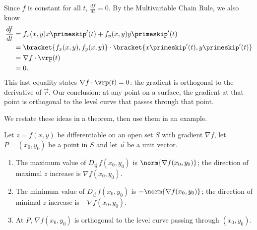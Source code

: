 Since $f$ is constant for all $t$, $\frac{df}{dt} = 0$. By the Multivariable Chain Rule, we also know
\begin{align*}
\frac{df}{dt} &= f_x(x,y)x\primeskip'(t) + f_y(x,y)y\primeskip'(t)\\
	&=\bracket{f_x(x,y),f_y(x,y)}\cdot\bracket{x\primeskip'(t),y\primeskip'(t)}\\
						&= \nabla f \cdot \vrp(t)\\
						&=0.
\end{align*}
This last equality states $\nabla f \cdot \vrp(t) = 0$: the gradient is orthogonal to the derivative of $\vec r$. Our conclusion: at any point on a surface, the gradient at that point is orthogonal to the level curve that passes through that point.

We restate these ideas in a theorem, then use them in an example.

{Let $z=f(x,y)$ be differentiable on an open set $S$ with gradient $\nabla f$, let $P=(x_0,y_0)$ be a point in $S$ and let $\vec u$ be a unit vector.
\begin{enumerate}
	\item The maximum value of $D_{\vec u\,}f(x_0,y_0)$ is $\norm{\nabla f(x_0,y_0)}$; the direction of maximal $z$ increase is $\nabla f(x_0,y_0)$.
	\item   The minimum value of $D_{\vec u\,}f(x_0,y_0)$ is $-\norm{\nabla f(x_0,y_0)}$; the direction of minimal $z$ increase is $-\nabla f(x_0,y_0)$.
	\item At $P$, $\nabla f(x_0,y_0)$ is orthogonal to the level curve passing through $(x_0,y_0)$.
\end{enumerate}}

